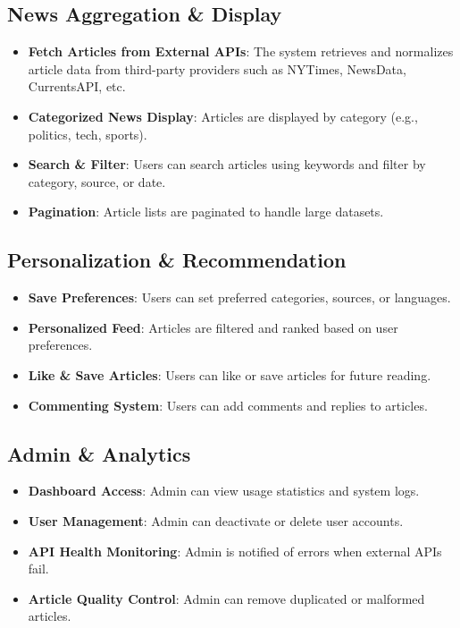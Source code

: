 \subsection{News Aggregation \& Display}\label{subsec:news-aggregation-diplay}

\begin{itemize}
    \item \textbf{Fetch Articles from External APIs}: The system retrieves and normalizes article data from third-party providers such as NYTimes, NewsData, CurrentsAPI, etc.
    \item \textbf{Categorized News Display}: Articles are displayed by category (e.g., politics, tech, sports).
    \item \textbf{Search \& Filter}: Users can search articles using keywords and filter by category, source, or date.
    \item \textbf{Pagination}: Article lists are paginated to handle large datasets.
\end{itemize}

\subsection{Personalization \& Recommendation}\label{subsec:personalization-recommendation}

\begin{itemize}
    \item \textbf{Save Preferences}: Users can set preferred categories, sources, or languages.
    \item \textbf{Personalized Feed}: Articles are filtered and ranked based on user preferences.
    \item \textbf{Like \& Save Articles}: Users can like or save articles for future reading.
    \item \textbf{Commenting System}: Users can add comments and replies to articles.
\end{itemize}

\subsection{Admin \& Analytics}\label{subsec:admin-analytics}

\begin{itemize}
    \item \textbf{Dashboard Access}: Admin can view usage statistics and system logs.
    \item \textbf{User Management}: Admin can deactivate or delete user accounts.
    \item \textbf{API Health Monitoring}: Admin is notified of errors when external APIs fail.
    \item \textbf{Article Quality Control}: Admin can remove duplicated or malformed articles.
\end{itemize}

